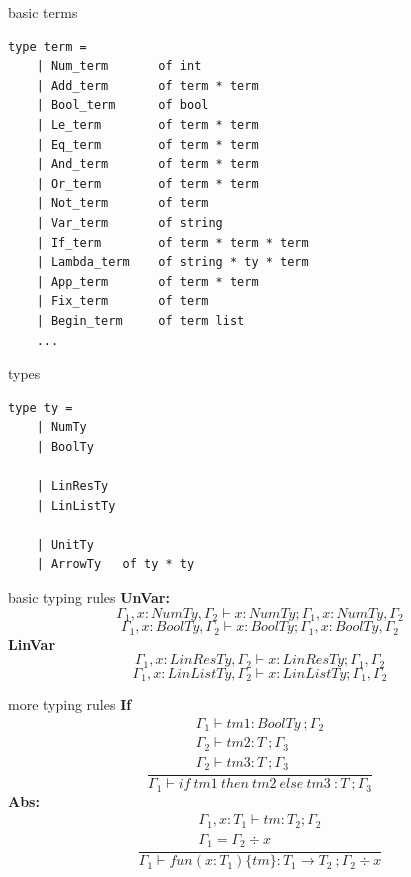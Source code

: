 \documentclass[10pt]{beamer}
\begin{document}
\begin{frame}[fragile]{basic terms}
\begin{verbatim}
type term =
    | Num_term       of int
    | Add_term       of term * term
    | Bool_term      of bool     
    | Le_term        of term * term
    | Eq_term        of term * term
    | And_term       of term * term
    | Or_term        of term * term
    | Not_term       of term
    | Var_term       of string
    | If_term        of term * term * term
    | Lambda_term    of string * ty * term
    | App_term       of term * term 
    | Fix_term       of term
    | Begin_term     of term list
    ...
\end{verbatim}
\end{frame}


\begin{frame}[fragile]{types}
\begin{verbatim}
type ty =
    | NumTy
    | BoolTy
    
    | LinResTy
    | LinListTy
    
    | UnitTy
    | ArrowTy   of ty * ty
\end{verbatim}
\end{frame}


\begin{frame}[fragile]{basic typing rules}
\textbf{UnVar:}
\[
	\Gamma_1 , x : NumTy, \Gamma_2 \vdash x : NumTy; \Gamma_1 , x : NumTy, \Gamma_2
\]
\[
	\Gamma_1 , x : BoolTy, \Gamma_2 \vdash x : BoolTy; \Gamma_1 , x : BoolTy, \Gamma_2
\]
\textbf{LinVar}
\[
	\Gamma_1 , x : LinResTy, \Gamma_2 \vdash x : LinResTy; \Gamma_1 , \Gamma_2
\]
\[
	\Gamma_1 , x : LinListTy, \Gamma_2 \vdash x : LinListTy; \Gamma_1 , \Gamma_2
\]
\end{frame}


\begin{frame}[fragile]{more typing rules}
\textbf{If}
\[
	\frac{
		\begin{array}{c}
			\Gamma_1 \vdash tm1 : BoolTy\ ; \Gamma_2 \\
			\Gamma_2 \vdash tm2: T\ ; \Gamma_3 \\
			\Gamma_2 \vdash tm3: T\ ; \Gamma_3
		\end{array}
	}{
		\Gamma_1 \vdash if\ tm1\ then\ tm2\ else\ tm3\ : T\ ; \Gamma_3
	}
\]
\textbf{Abs:}
\[
	\frac{
		\begin{array}{c}
			\Gamma_1, x:T_1 \vdash tm : T_2 ; \Gamma_2 \\
			\Gamma_1 = \Gamma_2 \div x
		\end{array}
	}{
		\Gamma_1 \vdash fun(x:T_1)\{tm\} : T_1 \rightarrow T_2\ ; \Gamma_2 \div x
	}
\]
\end{frame}
\end{document}

